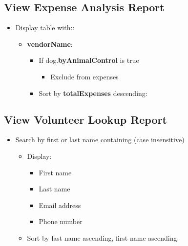\documentclass{article}
\begin{document}
\subsection{View Expense Analysis Report}
\begin{itemize}
\item Display table with::
\begin{itemize}
    \begin{Verbatim} [frame=single]
SELECT e.vendor AS vendorName, SUM(e.amount) 
    AS totalExpenses 
FROM Expense e 
JOIN Dog d ON e.dogID = d.dogID 
WHERE d.by_animal_control = FALSE 
GROUP BY e.vendor 
ORDER BY totalExpenses DESC;
    \end{Verbatim}
    \item \textbf{vendorName}:
    \begin{itemize}
        \item If dog.\textbf{byAnimalControl} is true
        \begin{itemize}
            \item Exclude from expenses
        \end{itemize}
        \item Sort by \textbf{totalExpenses} descending:
    \end{itemize}
\end{itemize}        
\end{itemize}   

\subsection{View Volunteer Lookup Report}
\begin{itemize}
\item Search by first or last name containing (case insensitive)
\begin{itemize}
    \begin{Verbatim} [frame=single]
 SELECT u.first_name, u.last_name, u.email, u.phone 
 FROM Volunteer v JOIN `User` u ON u.email = v.email 
 WHERE u.first_name LIKE 
    CONCAT('%',@searchText, '%') 
    OR u.last_name
        LIKE CONCAT('%',@searchText, '%')
 ORDER BY u.last_name ASC, u.first_name ASC;
    \end{Verbatim}
    \item Display:
    \begin{itemize}
        \item First name
        \item Last name
        \item Email address
        \item Phone number
    \end{itemize}
    \item Sort by last name ascending, first name ascending
\end{itemize}        
\end{itemize}    
\end{document}
